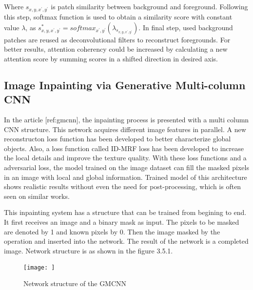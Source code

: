 Where \(s_{x,y,x^{'},y^{'}}\) is patch similarity between background and foreground. Following this step, softmax function is used to obtain a similarity score with constant value \(\lambda\), as \(s^{*}_{x,y,x^{'},y^{'}} = softmax_{x^{'},y^{'} } ( \lambda_{s_{x,y,x^{'},y^{'} } } )\). In final step, used background patches are reused as deconvolutional filters to reconstruct foregrounds. For better results, attention coherency could be increased by calculating a new attention score by summing scores in a shifted direction in desired axis.

\subsection{Image Inpainting via Generative Multi-column CNN}

In the article [ref:gmcnn], the inpainting process is presented with a multi column CNN structure. This network acquires different image features in parallel. A new reconstructon loss function has been developed to better characterize global objects. Also, a loss function called ID-MRF loss has been developed to increase the local details and improve the texture quality. With these loss functions and a adversarial loss, the model trained on the image dataset can fill the masked pixels in an image with local and global information. Trained model of this architecture shows realistic results without even the need for post-processing, which is often seen on similar works.

This inpainting system has a structure that can be trained from begining to end. It first receives an image and a binary mask as input. The pixels to be masked are denoted by 1 and known pixels by 0. Then the image masked by the  operation and inserted into the network. The result of the network is a completed image. Network structure is as shown in the figure 3.5.1.

\begin{figure}[h]
    \centering
    \texttt{[image: ]}
    \caption{Network structure of the GMCNN}
    \label{fig:my_label}
\end{figure}

